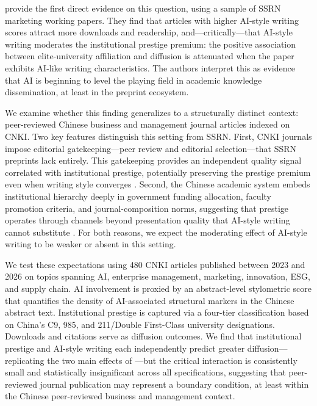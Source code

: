 \documentclass[12pt,a4paper]{article}
\begin{document}
\citet{JoLi2026} provide the first direct evidence on this question,
using a sample of SSRN marketing working papers.
They find that articles with higher AI-style writing scores attract
more downloads and readership, and---critically---that AI-style writing
moderates the institutional prestige premium: the positive association
between elite-university affiliation and diffusion is attenuated when
the paper exhibits AI-like writing characteristics.
The authors interpret this as evidence that AI is beginning to level
the playing field in academic knowledge dissemination, at least in the
preprint ecosystem.

We examine whether this finding generalizes to a structurally distinct
context: peer-reviewed Chinese business and management journal articles
indexed on CNKI.
Two key features distinguish this setting from SSRN.
First, CNKI journals impose editorial gatekeeping---peer review and
editorial selection---that SSRN preprints lack entirely.
This gatekeeping provides an independent quality signal correlated with
institutional prestige, potentially preserving the prestige premium
even when writing style converges \citep{Bornmann2008}.
Second, the Chinese academic system embeds institutional hierarchy
deeply in government funding allocation, faculty promotion criteria,
and journal-composition norms, suggesting that prestige operates
through channels beyond presentation quality that AI-style writing
cannot substitute \citep{DiMaggio1983,Long1979}.
For both reasons, we expect the moderating effect of AI-style writing
to be weaker or absent in this setting.

We test these expectations using 480 CNKI articles published between
2023 and 2026 on topics spanning AI, enterprise management, marketing,
innovation, ESG, and supply chain.
AI involvement is proxied by an abstract-level stylometric score that
quantifies the density of AI-associated structural markers in the
Chinese abstract text.
Institutional prestige is captured via a four-tier classification
based on China's C9, 985, and 211/Double First-Class university
designations.
Downloads and citations serve as diffusion outcomes.
We find that institutional prestige and AI-style writing each
independently predict greater diffusion---replicating the two main
effects of \citet{JoLi2026}---but the critical interaction is
consistently small and statistically insignificant across all
specifications, suggesting that peer-reviewed journal publication
may represent a boundary condition, at least within the Chinese peer-reviewed business and management context.
\end{document}
